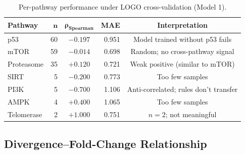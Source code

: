 \documentclass[11pt,a4paper]{article}
\newcommand{\rhosp}{\rho_{\text{Spearman}}}
\begin{document}
\begin{table}[H]
\centering
\caption{Per-pathway performance under LOGO cross-validation (Model 1).}
\label{tab:pathway_perf}
\begin{tabular}{@{}lrcrc@{}}
\toprule
\textbf{Pathway} & $\boldsymbol{n}$ & $\boldsymbol{\rhosp}$ & \textbf{MAE} & \textbf{Interpretation} \\
\midrule
p53        & 60 & $-0.197$ & 0.951 & Model trained without p53 fails \\
mTOR       & 59 & $-0.014$ & 0.698 & Random; no cross-pathway signal \\
Proteasome & 35 & $+0.120$ & 0.721 & Weak positive (similar to mTOR) \\
SIRT       &  5 & $-0.200$ & 0.773 & Too few samples \\
PI3K       &  5 & $-0.700$ & 1.106 & Anti-correlated; rules don't transfer \\
AMPK       &  4 & $+0.400$ & 1.065 & Too few samples \\
Telomerase &  2 & $+1.000$ & 0.751 & $n=2$; not meaningful \\
\bottomrule
\end{tabular}
\end{table}

\subsection{Divergence--Fold-Change Relationship}
\end{document}
